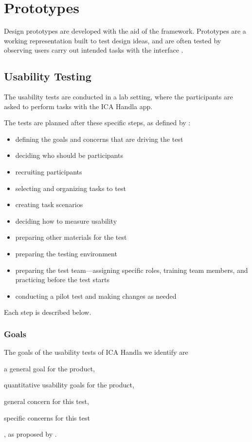 \section{Prototypes}
Design prototypes are developed with the aid of the framework. Prototypes are a working representation built to test design ideas, and are often tested by observing users carry out intended tasks with the interface \cite{Walker2002}.

\subsection{Usability Testing}
The usability tests are conducted in a lab setting, where the participants are asked to perform tasks with the ICA Handla app.

The tests are planned after these specific steps, as defined by \cite{Dumas1999}:

\begin{itemize}[noitemsep]
  \item defining the goals and concerns that are driving the test
  \item deciding who should be participants
  \item recruiting participants
  \item selecting and organizing tasks to test
  \item creating task scenarios
  \item deciding how to measure usability
  \item preparing other materials for the test
  \item preparing the testing environment
  \item preparing the test team---assigning specific roles, training team members, and practicing before the test starts
  \item conducting a pilot test and making changes as needed
\end{itemize}

Each step is described below.

\subsubsection{Goals}
\label{subsubsec:goals}
The goals of the usability tests of ICA Handla we identify are \begin{enumerate*}[label=(\(\arabic*\))]
  \item a general goal for the product,
  \item quantitative usability goals for the product,
  \item general concern for this test,
  \item specific concerns for this test
\end{enumerate*}, as proposed by \cite{Dumas1999}.

